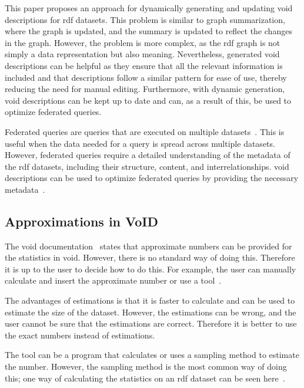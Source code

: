 This paper proposes an approach for dynamically generating and updating \gls{void} descriptions for \gls{rdf} datasets. This problem is similar to graph summarization, where the graph is updated, and the summary is updated to reflect the changes in the graph. However, the problem is more complex, as the \gls{rdf} graph is not simply a data representation but also meaning. Nevertheless, generated \gls{void} descriptions can be helpful as they ensure that all the relevant information is included and that descriptions follow a similar pattern for ease of use, thereby reducing the need for manual editing. Furthermore, with dynamic generation, \gls{void} descriptions can be kept up to date and can, as a result of this, be used to optimize federated queries.

Federated queries are queries that are executed on multiple datasets~\cite{intro-federated-query}. This is useful when the data needed for a query is spread across multiple datasets. However, federated queries require a detailed understanding of the metadata of the \gls{rdf} datasets, including their structure, content, and interrelationships. \gls{void} descriptions can be used to optimize federated queries by providing the necessary metadata~\cite{rdf-federated-query}.

\subsection{Approximations in VoID} \label{sec:approximations}
The \gls{void} documentation~\cite{documentation-void} states that approximate numbers can be provided for the statistics in \gls{void}.
However, there is no standard way of doing this. Therefore it is up to the user to decide how to do this. For example, the user can manually calculate and insert the approximate number or use a tool~\cite{the-web-of-data}.

The advantages of estimations is that it is faster to calculate and can be used to estimate the size of the dataset. However, the estimations can be wrong, and the user cannot be sure that the estimations are correct. Therefore it is better to use the exact numbers instead of estimations.

The tool can be a program that calculates or uses a sampling method to estimate the number. However, the sampling method is the most common way of doing this; one way of calculating the statistics on an \gls{rdf} dataset can be seen here~\cite{zneika2016rdf}.

